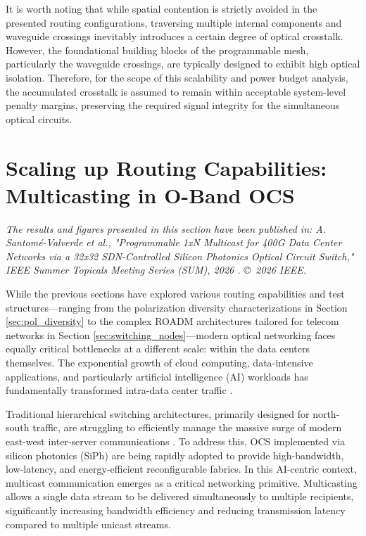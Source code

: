 It is worth noting that while spatial contention is strictly avoided in the presented routing 
configurations, traversing multiple internal components and waveguide crossings inevitably 
introduces a certain degree of optical crosstalk. However, the foundational building blocks of the 
programmable mesh, particularly the waveguide crossings, are typically designed to exhibit high 
optical isolation. Therefore, for the scope of this scalability and power budget analysis, the 
accumulated crosstalk is assumed to remain within acceptable system-level penalty margins, 
preserving the required signal integrity for the simultaneous optical circuits.






\section{Scaling up Routing Capabilities: Multicasting in O-Band OCS}\label{sec:multicast}

\begin{center}
    \textit{The results and figures presented in this section have been published in: 
    A. Santomé-Valverde \textit{et al.}, "Programmable 1xN Multicast for 400G Data Center Networks 
    via a 32x32 SDN-Controlled Silicon Photonics Optical Circuit Switch," \textit{IEEE Summer 
    Topicals Meeting Series (SUM)}, 2026 \cite{Santome2026_SummerTopicals}. \copyright~2026 IEEE.}
\end{center}
\vspace{1em}

While the previous sections have explored various routing capabilities and test structures—ranging 
from the polarization diversity characterizations in Section \ref{sec:pol_diversity} to the complex 
ROADM architectures tailored for telecom networks in Section \ref{sec:switching_nodes}—modern 
optical networking faces equally critical bottlenecks at a different scale: within the data centers 
themselves. The exponential growth of cloud computing, data-intensive applications, and 
particularly artificial intelligence (AI) workloads has fundamentally transformed intra-data center 
traffic \cite{patronasOpticalSwitchingData2025, poutievskiJupiterEvolvingTransforming2022}.


Traditional hierarchical switching architectures, primarily designed for north-south traffic, are 
struggling to efficiently manage the massive surge of modern east-west inter-server communications 
\cite{satoOpticalSwitchingWill2024}. To address this, OCS implemented via silicon photonics (SiPh) 
are being rapidly adopted to provide high-bandwidth, low-latency, and energy-efficient 
reconfigurable fabrics. In this AI-centric context, multicast communication emerges as a critical 
networking primitive. Multicasting allows a single data stream to be delivered simultaneously to 
multiple recipients, significantly increasing bandwidth efficiency and reducing transmission 
latency compared to multiple unicast streams. 

